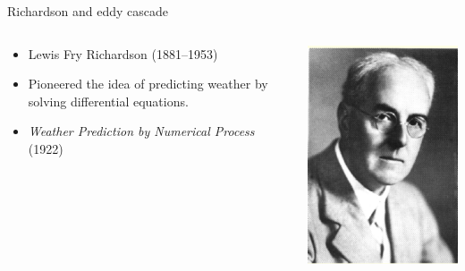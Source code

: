 \begin{frame}{Richardson and eddy cascade}
\setlength{\fboxsep}{0pt}
\setlength{\fboxrule}{1pt}
\begin{columns}[T]
    \begin{column}{.58\textwidth}
    	\begin{itemize}
    		\item Lewis Fry Richardson (1881--1953)
    		\item Pioneered the idea of predicting weather by solving differential equations.
    		\item \emph{Weather Prediction by Numerical Process} (1922)
    	\end{itemize}	
    \end{column}
    \begin{column}{.42\textwidth}
    	\begin{minipage}[c][.5\textheight][c]{\linewidth}
    		\includegraphics[width=\textwidth]{richardson.png}
    	\end{minipage}
    \end{column}
  \end{columns}
\end{frame}

